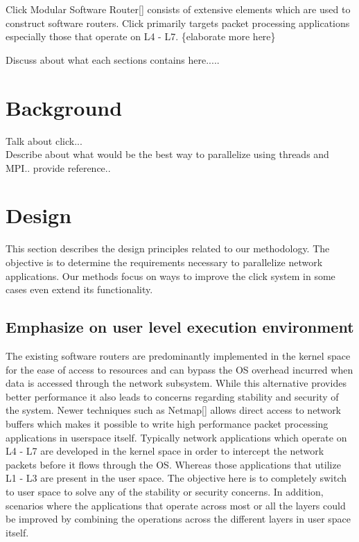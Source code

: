\documentclass[prodmode,acmtaco]{acmsmall}
\begin{document}
Click Modular Software Router[] consists of extensive elements which are used to construct software routers. Click primarily targets packet processing applications especially those that operate on L4 - L7. \{elaborate more here\}

Discuss about what each sections contains here.....  

\section{Background}

Talk about click...\\

Describe about what would be the best way to parallelize using threads and MPI.. provide reference.. \\ 

\section{Design}

This section describes the design principles related to our methodology. The objective is to determine the requirements necessary to parallelize network applications. Our methods focus on ways to improve the click system in some cases even extend its functionality.

\subsection{Emphasize on user level execution environment}

The existing software routers are predominantly implemented in the kernel space for the ease of access to resources and can bypass the OS overhead incurred when data is accessed through the network subsystem. While this alternative provides better performance it also leads to concerns regarding stability and security of the system. Newer techniques such as Netmap[] allows direct access to network buffers which makes it possible to write high performance packet processing applications in userspace itself. Typically network applications which operate on L4 - L7 are developed in the kernel space in order to intercept the network packets before it flows through the OS. Whereas those applications that utilize L1 - L3 are present in the user space. The objective here is to completely switch to user space to solve any of the stability or security concerns. In addition, scenarios where the applications that operate across most or all the layers could be improved by combining the operations across the different layers in user space itself.  
\end{document}
